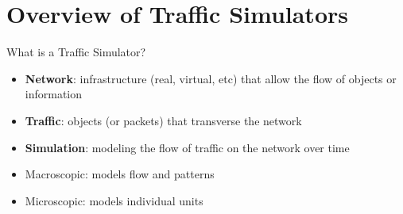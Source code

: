 \section{Overview of Traffic Simulators}

    \frame{\sectionpage}
    
    \begin{frame}{What is a Traffic Simulator?}
        \begin{itemize}
            \item \textbf{Network}: infrastructure (real, virtual, etc) that allow the flow of objects or information
            \item \textbf{Traffic}: objects (or packets) that transverse the network
            \item \textbf{Simulation}:  modeling the flow of traffic on the network over time
            \vspace{22pt}
                \item Macroscopic:  models flow and patterns
                \item Microscopic:  models individual units
        \end{itemize}
    \end{frame}    
    
